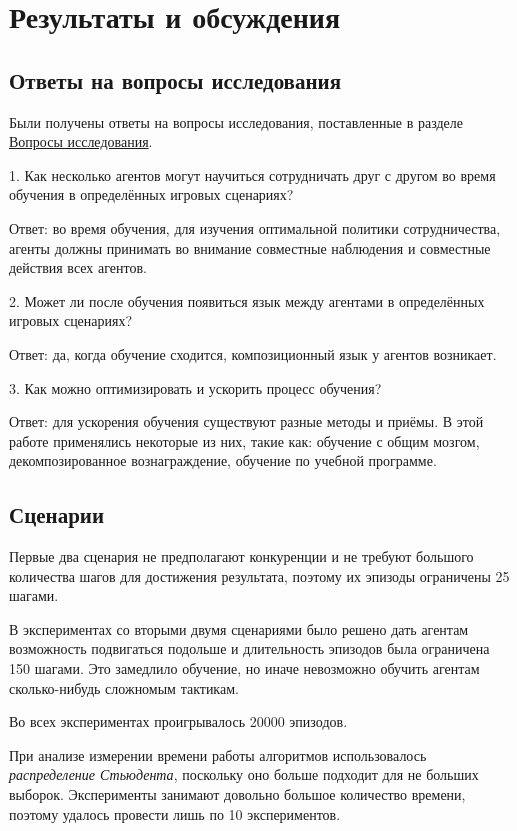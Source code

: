 \chapter{Результаты и обсуждения}


\section{Ответы на вопросы исследования}

Были получены ответы на вопросы исследования, поставленные в разделе \hyperref[intro-questions]{Вопросы исследования}.

1. Как несколько агентов могут научиться сотрудничать друг с другом во время обучения в определённых игровых сценариях?

Ответ: во время обучения, для изучения оптимальной политики сотрудничества, агенты должны принимать во внимание совместные наблюдения и совместные действия всех агентов.

2. Может ли после обучения появиться язык между агентами в определённых игровых сценариях?

Ответ: да, когда обучение сходится, композиционный язык у агентов возникает.

3. Как можно оптимизировать и ускорить процесс обучения?

Ответ: для ускорения обучения существуют разные методы и приёмы. В этой работе применялись некоторые из них, такие как: обучение с общим мозгом, декомпозированное вознаграждение, обучение по учебной программе.

\newpage

\section{Сценарии}

Первые два сценария не предполагают конкуренции и не требуют большого количества шагов для достижения результата, поэтому их эпизоды ограничены 25 шагами.

В экспериментах со вторыми двумя сценариями было решено дать агентам возможность подвигаться подольше и длительность эпизодов была ограничена 150 шагами. Это замедлило обучение, но иначе невозможно обучить агентам сколько-нибудь сложномым тактикам.

Во всех экспериментах проигрывалось 20000 эпизодов.

При анализе измерении времени работы алгоритмов использовалось \textit{распределение Стьюдента}, поскольку оно больше подходит для не больших выборок. Эксперименты занимают довольно большое количество времени, поэтому удалось провести лишь по 10 экспериментов.

